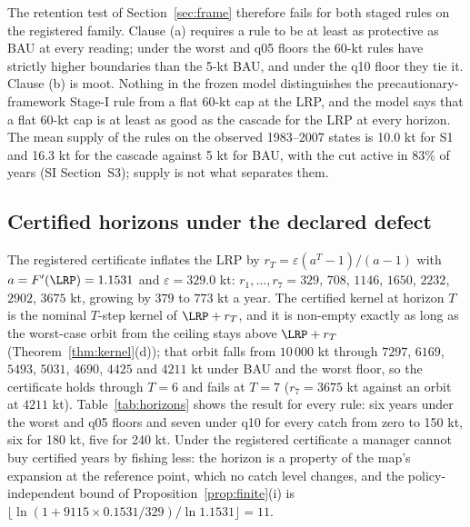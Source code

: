 The retention test of Section~\ref{sec:frame} therefore fails for both staged rules on the registered family. Clause (a) requires a rule to be at least as protective as BAU at every reading; under the worst and q05 floors the 60-kt rules have strictly higher boundaries than the 5-kt BAU, and under the q10 floor they tie it. Clause (b) is moot. Nothing in the frozen model distinguishes the precautionary-framework Stage-I rule from a flat 60-kt cap at the LRP, and the model says that a flat 60-kt cap is at least as good as the cascade for the LRP at every horizon. The mean supply of the rules on the observed 1983--2007 states is 10.0 kt for S1 and 16.3 kt for the cascade against 5 kt for BAU, with the cut active in 83\% of years (SI Section~S3); supply is not what separates them.

\subsection{Certified horizons under the declared defect}\label{sec:cod-horizon}

The registered certificate inflates the LRP by $r_T=\varepsilon(a^{T}-1)/(a-1)$ with $a=F'(\LRP)=1.1531$ and $\varepsilon=329.0$ kt: $r_1,\dots,r_7=329$, $708$, $1146$, $1650$, $2232$, $2902$, $3675$ kt, growing by $379$ to $773$ kt a year. The certified kernel at horizon $T$ is the nominal $T$-step kernel of $\LRP+r_T$, and it is non-empty exactly as long as the worst-case orbit from the ceiling stays above $\LRP+r_T$ (Theorem~\ref{thm:kernel}(d)); that orbit falls from $10\,000$ kt through $7297$, $6169$, $5493$, $5031$, $4690$, $4425$ and $4211$ kt under BAU and the worst floor, so the certificate holds through $T=6$ and fails at $T=7$ ($r_7=3675$ kt against an orbit at $4211$ kt). Table~\ref{tab:horizons} shows the result for every rule: six years under the worst and q05 floors and seven under q10 for every catch from zero to 150 kt, six for 180 kt, five for 240 kt. Under the registered certificate a manager cannot buy certified years by fishing less: the horizon is a property of the map's expansion at the reference point, which no catch level changes, and the policy-independent bound of Proposition~\ref{prop:finite}(i) is $\lfloor\ln(1+9115\times0.1531/329)/\ln1.1531\rfloor=11$.



